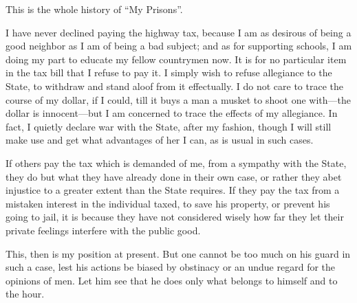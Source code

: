 \documentclass[letterpaper,12pt]{article}
\begin{document}
This is the whole history of \enquote{My Prisons}.

I have never declined paying the highway tax, because I am as desirous of being
a good neighbor as I am of being a bad subject; and as for supporting schools,
I am doing my part to educate my fellow countrymen now. It is for no particular
item in the tax bill that I refuse to pay it. I simply wish to refuse allegiance
to the State, to withdraw and stand aloof from it effectually. I do not care to
trace the course of my dollar, if I could, till it buys a man a musket to shoot
one with---the dollar is innocent---but I am concerned to trace the effects of
my allegiance. In fact, I quietly declare war with the State, after my fashion,
though I will still make use and get what advantages of her I can, as is usual
in such cases.

If others pay the tax which is demanded of me, from a sympathy with the State,
they do but what they have already done in their own case, or rather they abet
injustice to a greater extent than the State requires. If they pay the tax from
a mistaken interest in the individual taxed, to save his property, or prevent
his going to jail, it is because they have not considered wisely how far they
let their private feelings interfere with the public good.

This, then is my position at present. But one cannot be too much on his guard in
such a case, lest his actions be biased by obstinacy or an undue regard for the
opinions of men. Let him see that he does only what belongs to himself and to
the hour.
\end{document}
